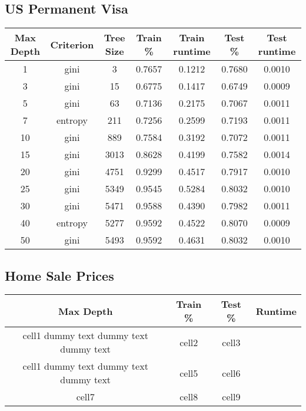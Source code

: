 \documentclass[h]{article}
\begin{document}
\subsection*{US Permanent Visa}
\begin{tabular}{ | c | c  | c | c | c | c | c |} 
\hline
\textbf{Max Depth} & \textbf{Criterion} & \textbf{Tree Size} & \textbf{Train \%} & \textbf{Train runtime} & \textbf{Test \%} & \textbf{Test runtime}   \\
\hline
1 & gini & 3 & 0.7657 & 0.1212 & 0.7680 & 0.0010 \\ \hline
3 & gini & 15 & 0.6775 & 0.1417 & 0.6749 & 0.0009 \\ \hline
5 & gini & 63 & 0.7136 & 0.2175 & 0.7067 & 0.0011 \\ \hline
7 & entropy & 211 & 0.7256 & 0.2599 & 0.7193 & 0.0011 \\ \hline
10 & gini & 889 & 0.7584 & 0.3192 & 0.7072 & 0.0011 \\ \hline
15 & gini & 3013 & 0.8628 & 0.4199 & 0.7582 & 0.0014 \\ \hline
20 & gini & 4751 & 0.9299 & 0.4517 & 0.7917 & 0.0010 \\ \hline
25 & gini & 5349 & 0.9545 & 0.5284 & 0.8032 & 0.0010 \\ \hline
30 & gini & 5471 & 0.9588 & 0.4390 & 0.7982 & 0.0011 \\ \hline
40 & entropy & 5277 & 0.9592 & 0.4522 & 0.8070 & 0.0009 \\ \hline
50 & gini & 5493 & 0.9592 & 0.4631 & 0.8032 & 0.0010 \\ \hline
\end{tabular}

\subsection*{Home Sale Prices}
\begin{tabular}{ | c | c | c | c | } 
\hline
\textbf{Max Depth} & \textbf{Train \%} & \textbf{Test \%} & \textbf{Runtime}  \\
\hline
cell1 dummy text dummy text dummy text& cell2 & cell3 \\ 
\hline
cell1 dummy text dummy text dummy text & cell5 & cell6 \\ 
\hline
cell7 & cell8 & cell9 \\ 
\hline
\end{tabular}
\end{document}
